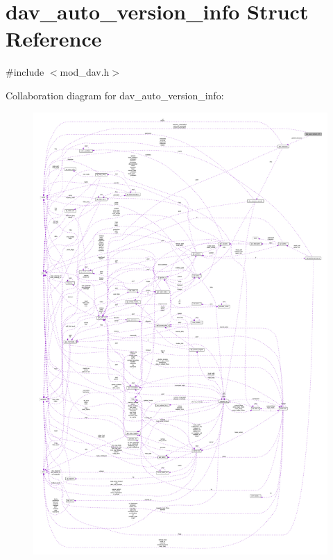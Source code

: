 \hypertarget{structdav__auto__version__info}{}\section{dav\+\_\+auto\+\_\+version\+\_\+info Struct Reference}
\label{structdav__auto__version__info}


{\ttfamily \#include $<$mod\+\_\+dav.\+h$>$}



Collaboration diagram for dav\+\_\+auto\+\_\+version\+\_\+info\+:
\nopagebreak
\begin{figure}[H]
\begin{center}
\leavevmode
\includegraphics[width=350pt]{structdav__auto__version__info__coll__graph}
\end{center}
\end{figure}
